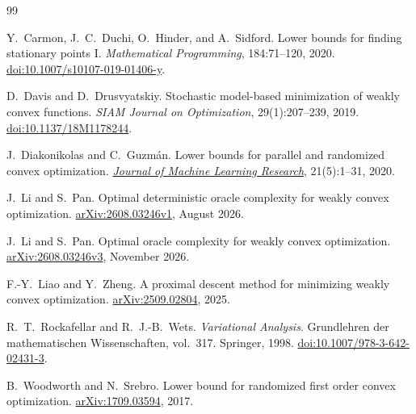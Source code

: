 \documentclass[11pt,a4paper]{article}
\theoremstyle{definition}
\numberwithin{equation}{section}
\begin{document}
\clearpage
\begin{thebibliography}{99}
\small
\setlength{\itemsep}{0.35em}
\setlength{\parskip}{0pt}

Y.~Carmon, J.~C.~Duchi, O.~Hinder, and A.~Sidford.
\newblock Lower bounds for finding stationary points I.
\newblock \emph{Mathematical Programming}, 184:71--120, 2020.
\newblock \href{https://doi.org/10.1007/s10107-019-01406-y}{doi:10.1007/s10107-019-01406-y}.

D.~Davis and D.~Drusvyatskiy.
\newblock Stochastic model-based minimization of weakly convex functions.
\newblock \emph{SIAM Journal on Optimization}, 29(1):207--239, 2019.
\newblock \href{https://doi.org/10.1137/18M1178244}{doi:10.1137/18M1178244}.

J.~Diakonikolas and C.~Guzm\'an.
\newblock Lower bounds for parallel and randomized convex optimization.
\newblock \emph{\href{https://jmlr.org/papers/v21/19-771.html}{Journal of Machine Learning Research}}, 21(5):1--31, 2020.

J.~Li and S.~Pan.
\newblock Optimal deterministic oracle complexity for weakly convex optimization.
\newblock \href{https://arxiv.org/abs/2608.03246v1}{arXiv:2608.03246v1}, August 2026.

J.~Li and S.~Pan.
\newblock Optimal oracle complexity for weakly convex optimization.
\newblock \href{https://arxiv.org/abs/2608.03246v3}{arXiv:2608.03246v3}, November 2026.

F.-Y.~Liao and Y.~Zheng.
\newblock A proximal descent method for minimizing weakly convex optimization.
\newblock \href{https://arxiv.org/abs/2509.02804}{arXiv:2509.02804}, 2025.

R.~T.~Rockafellar and R.~J.-B.~Wets.
\newblock \emph{Variational Analysis}.
\newblock Grundlehren der mathematischen Wissenschaften, vol.~317.
\newblock Springer, 1998.
\newblock \href{https://doi.org/10.1007/978-3-642-02431-3}{doi:10.1007/978-3-642-02431-3}.

B.~Woodworth and N.~Srebro.
\newblock Lower bound for randomized first order convex optimization.
\newblock \href{https://arxiv.org/abs/1709.03594}{arXiv:1709.03594}, 2017.

\end{thebibliography}
\end{document}
